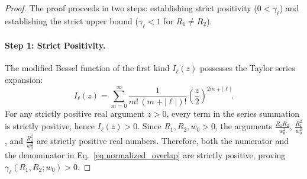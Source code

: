 \documentclass[11pt,a4paper]{article}
\begin{document}
\begin{proof}
The proof proceeds in two steps: establishing strict positivity ($0 < \gamma_\ell$) and establishing the strict upper bound ($\gamma_\ell < 1$ for $R_1 \neq R_2$).

\paragraph{Step 1: Strict Positivity.}
The modified Bessel function of the first kind $I_\ell(z)$ possesses the Taylor series expansion:
\begin{equation}
I_\ell(z) = \sum_{m=0}^\infty \frac{1}{{m}! \, (m + |\ell|){!}} \left( \frac{z}{2} \right)^{2m + |\ell|}.
\label{eq:bessel_taylor_series}
\end{equation}
For any strictly positive real argument $z > 0$, every term in the series summation is strictly positive, hence $I_\ell(z) > 0$. Since $R_1, R_2, w_0 > 0$, the arguments $\frac{R_1 R_2}{w_0^2}$, $\frac{R_1^2}{w_0^2}$, and $\frac{R_2^2}{w_0^2}$ are strictly positive real numbers. Therefore, both the numerator and the denominator in Eq.~\eqref{eq:normalized_overlap} are strictly positive, proving $\gamma_\ell(R_1, R_2; w_0) > 0$.


\end{proof}
\end{document}
